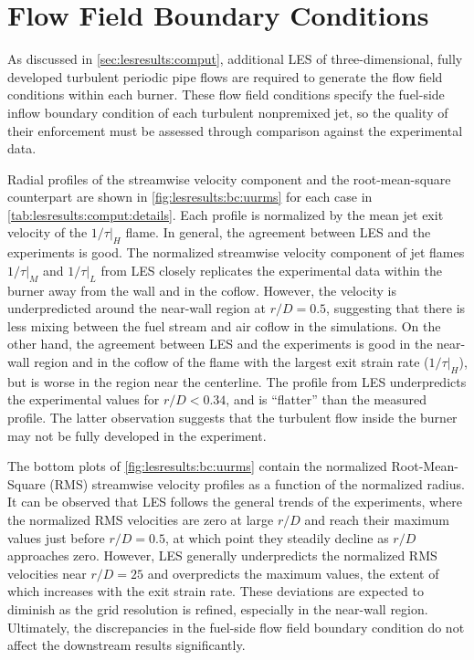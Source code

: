 \section{Flow Field Boundary Conditions}
\label{sec:lesresults:bc}

As discussed in \cref{sec:lesresults:comput}, additional LES of three-dimensional, fully developed turbulent periodic pipe flows are required to generate the flow field conditions within each burner. These flow field conditions specify the fuel-side inflow boundary condition of each turbulent nonpremixed jet, so the quality of their enforcement must be assessed through comparison against the experimental data. 

Radial profiles of the streamwise velocity component and the root-mean-square counterpart are shown in \cref{fig:lesresults:bc:uurms} for each case in \cref{tab:lesresults:comput:details}. Each profile is normalized by the mean jet exit velocity of the $1/\tau|_H$ flame. In general, the agreement between LES and the experiments is good. The normalized streamwise velocity component of jet flames $1/\tau|_M$ and $1/\tau|_L$ from LES closely replicates the experimental data within the burner away from the wall and in the coflow. However, the velocity is underpredicted around the near-wall region at $r/D = 0.5$, suggesting that there is less mixing between the fuel stream and air coflow in the simulations. On the other hand, the agreement between LES and the experiments is good in the near-wall region and in the coflow of the flame with the largest exit strain rate ($1/\tau|_H$), but is worse in the region near the centerline. The profile from LES underpredicts the experimental values for $r/D < 0.34$, and is ``flatter'' than the measured profile. The latter observation suggests that the turbulent flow inside the burner may not be fully developed in the experiment.

The bottom plots of \cref{fig:lesresults:bc:uurms} contain the normalized Root-Mean-Square (RMS) streamwise velocity profiles as a function of the normalized radius. It can be observed that LES follows the general trends of the experiments, where the normalized RMS velocities are zero at large $r/D$ and reach their maximum values just before $r/D = 0.5$, at which point they steadily decline as $r/D$ approaches zero. However, LES generally underpredicts the normalized RMS velocities near $r/D = 25$ and overpredicts the maximum values, the extent of which increases with the exit strain rate. These deviations are expected to diminish as the grid resolution is refined, especially in the near-wall region. Ultimately, the discrepancies in the fuel-side flow field boundary condition do not affect the downstream results significantly.

